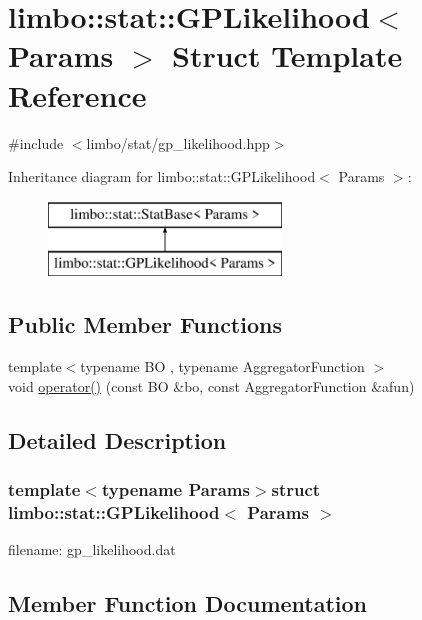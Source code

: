 \hypertarget{structlimbo_1_1stat_1_1_g_p_likelihood}{}\section{limbo\+:\+:stat\+:\+:G\+P\+Likelihood$<$ Params $>$ Struct Template Reference}
\label{structlimbo_1_1stat_1_1_g_p_likelihood}


{\ttfamily \#include $<$limbo/stat/gp\+\_\+likelihood.\+hpp$>$}

Inheritance diagram for limbo\+:\+:stat\+:\+:G\+P\+Likelihood$<$ Params $>$\+:\begin{figure}[H]
\begin{center}
\leavevmode
\includegraphics[height=2.000000cm]{structlimbo_1_1stat_1_1_g_p_likelihood}
\end{center}
\end{figure}
\subsection*{Public Member Functions}
\begin{DoxyCompactItemize}
\item 
{\footnotesize template$<$typename B\+O , typename Aggregator\+Function $>$ }\\void \hyperlink{structlimbo_1_1stat_1_1_g_p_likelihood_ac5590ba5e63354d6318d78712c8f6074}{operator()} (const B\+O \&bo, const Aggregator\+Function \&afun)
\end{DoxyCompactItemize}


\subsection{Detailed Description}
\subsubsection*{template$<$typename Params$>$struct limbo\+::stat\+::\+G\+P\+Likelihood$<$ Params $>$}

filename\+: {\ttfamily gp\+\_\+likelihood.\+dat} 

\subsection{Member Function Documentation}
\hypertarget{structlimbo_1_1stat_1_1_g_p_likelihood_ac5590ba5e63354d6318d78712c8f6074}{}

